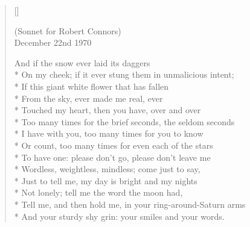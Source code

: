 \label{ch:the_oldest_love_poem}
\settowidth{\versewidth}{Tell me, and then hold me, in your ring-around-Saturn arms}
\begin{verse}[\versewidth]
\epigraph{(Sonnet for Robert Connors)\\December 22nd 1970}{}

And if the snow ever laid its daggers\\*
On my cheek; if it ever stung them in unmalicious intent;\\*
If this giant white flower that has fallen\\*
From the sky, ever made me real, ever\\*
Touched my heart, then you have, over and over\\*
Too many times for the brief seconds, the seldom seconds\\*
I have with you, too many times for you to know\\*
Or count, too many times for even each of the stars\\*
To have one: please don't go, please don't leave me\\*
Wordless, weightless, mindless; come just to say,\\*
Just to tell me, my day is bright and my nights\\*
Not lonely; tell me the word the moon had,\\*
Tell me, and then hold me, in your ring-around-Saturn arms\\*
And your sturdy shy grin: your smiles and your words.
\end{verse}
